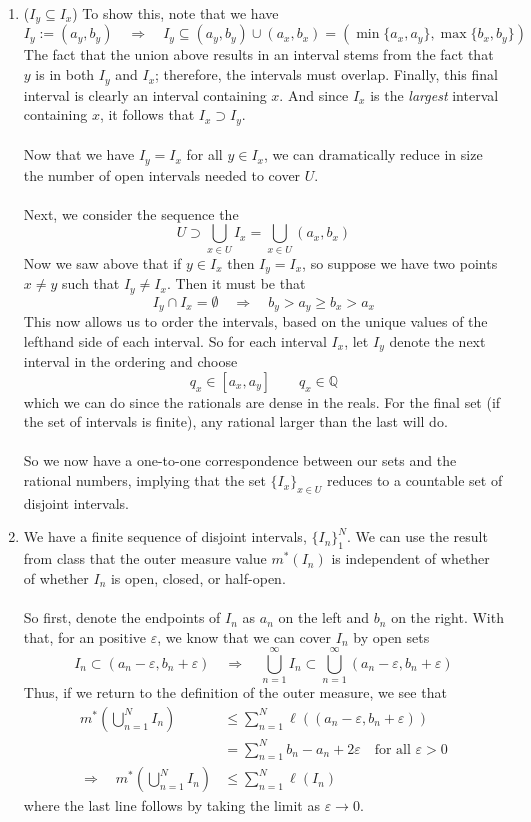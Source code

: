 \documentclass[12pt]{article}
\theoremstyle{plain}
\theoremstyle{definition}
\theoremstyle{remark}
\begin{document}
\begin{enumerate}
\item ($I_y\subseteq I_x$) To show this, note that we have
\[
    I_y := (a_y, b_y) \quad \Rightarrow \quad
    I_y\subseteq (a_y, b_y) \cup (a_x, b_x) 
    = (\min\{a_x,a_y\}, \max\{b_x, b_y\})
\]
The fact that the union above results in an interval stems from the fact that $y$ is in both $I_y$ and $I_x$; therefore, the intervals must overlap. Finally, this final interval is clearly an interval containing $x$. And since $I_x$ is the \emph{largest} interval containing $x$, it follows that $I_x\supset I_y$.
\\
\\
Now that we have $I_y = I_x$ for all $y\in I_x$, we can dramatically reduce in size the number of open intervals needed to cover $U$. 
\\
\\
Next, we consider the sequence the 
\[
    U\supset \bigcup_{x\in U} I_x 
    =\bigcup_{x\in U} (a_x, b_x)
\]
Now we saw above that if $y\in I_x$ then $I_y = I_x$, so suppose we have two points $x\neq y$ such that $I_y\neq I_x$. Then it must be that
\[
    I_y \cap I_x = \emptyset \quad \Rightarrow
    \quad b_y > a_y \geq b_x > a_x
\]
This now allows us to order the intervals, based on the unique values of the lefthand side of each interval. So for each interval $I_x$, let $I_y$ denote the next interval in the ordering and choose
\[
    q_x \in [a_x, a_y] \qquad q_x \in \mathbb{Q}
\]
which we can do since the rationals are dense in the reals. For the final set (if the set of intervals is finite), any rational larger than the last will do.
\\
\\
So we now have a one-to-one correspondence between our sets and the rational numbers, implying that the set $\{I_x\}_{x\in U}$ reduces to a countable set of disjoint intervals.


\item We have a finite sequence of disjoint intervals, $\{I_n\}_1^N$. We can use the result from class that the outer measure value $m^*(I_n)$ is independent of whether of whether $I_n$ is open, closed, or half-open.
\\
\\
So first, denote the endpoints of $I_n$ as $a_n$ on the left and $b_n$ on the right. With that, for an positive $\varepsilon$, we know that we can cover $I_n$ by open sets
\[
    I_n \subset (a_n-\varepsilon, b_n+\varepsilon)
    \quad \Rightarrow\quad
    \bigcup^\infty_{n=1} I_n \subset 
    \bigcup^\infty_{n=1}(a_n-\varepsilon, b_n+\varepsilon)
\]
Thus, if we return to the definition of the outer measure, we see that 
\begin{align*}
    m^*\left(\bigcup^N_{n=1} I_n\right) &\leq 
    \sum^N_{n=1} \ell\left((a_n-\varepsilon, b_n+\varepsilon)
    \right) \\
    &= \sum^N_{n=1} b_n - a_n + 2\varepsilon 
    \quad \text{for all $\varepsilon>0$}\\
    \Rightarrow\quad
    m^*\left(\bigcup^N_{n=1} I_n\right) &\leq 
    \sum^N_{n=1} \ell(I_n) 
\end{align*}
where the last line follows by taking the limit as $\varepsilon\rightarrow 0$.


\end{enumerate}
\end{document}
